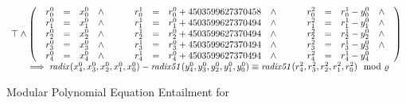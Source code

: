 \vspace{-2em}
\begin{figure}
  \centering
  \[
  \begin{array}{l}
  \top \wedge
  \left(
  \begin{array}{lclcl}
    \begin{array}{rclc}
      {r}^0_0 & = & {x}^0_0 & \wedge \\
      {r}^0_1 & = & {x}^0_1 & \wedge \\
      {r}^0_2 & = & {x}^0_2 & \wedge \\
      {r}^0_3 & = & {x}^0_3 & \wedge \\
      {r}^0_4 & = & {x}^0_4 & \wedge \\
    \end{array}
    &\hspace{.01\textwidth}&
    \begin{array}{rclc}
      {r}^1_0 & = & {r}^0_0 + {4503599627370458} & \wedge \\
      {r}^1_1 & = & {r}^0_1 + {4503599627370494} & \wedge \\
      {r}^1_2 & = & {r}^0_2 + {4503599627370494} & \wedge \\
      {r}^1_3 & = & {r}^0_3 + {4503599627370494} & \wedge \\
      {r}^1_4 & = & {r}^0_4 + {4503599627370494} & \wedge\\
    \end{array}
    &\hspace{.01\textwidth}&
    \begin{array}{rclc}
      {r}^2_0 & = & {r}^1_0 - {y}^0_0 & \wedge \\
      {r}^2_1 & = & {r}^1_1 - {y}^0_1 & \wedge \\
      {r}^2_2 & = & {r}^1_2 - {y}^0_2 & \wedge \\
      {r}^2_3 & = & {r}^1_3 - {y}^0_3 & \wedge \\
      {r}^2_4 & = & {r}^1_4 - {y}^0_4
    \end{array}
  \end{array}
  \right)\\
    \hspace{.05\textwidth}
    \implies 
    \mathit{radix}({x}^0_4, {x}^0_3, {x}^0_2, {x}^0_1, {x}^0_0) -
    \mathit{radix51}({y}^0_4, {y}^0_3, {y}^0_2, {y}^0_1, {y}^0_0)
    \equiv
    \mathit{radix51}({r}^2_4, {r}^2_3, {r}^2_2, {r}^2_1, {r}^2_0)
    \mod \myprime
  \end{array}
  \]
  \caption{Modular Polynomial Equation Entailment for }
  \label{figure:translation:subtraction-polynomial}
\end{figure}
\vspace{-1em}

